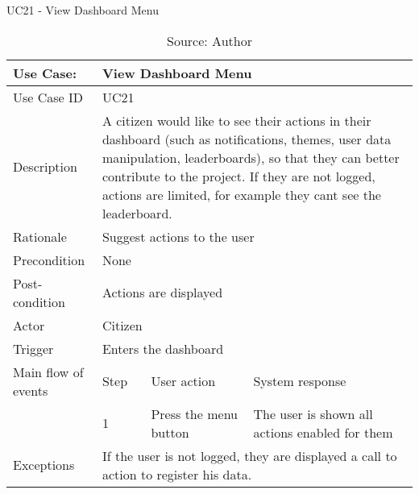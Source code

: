\begin{table}[ht]
\centering
\caption{UC21 - View Dashboard Menu}
\label{uc:21}
\begin{tabular}{|p{3cm}|p{1cm}|p{5cm}|p{5cm}|}
\hline
Use Case:       & \multicolumn{3}{p{11cm}|}{View Dashboard Menu} \\ \hline
Use Case ID     & \multicolumn{3}{p{11cm}|}{UC21} \\ \hline
Description     & \multicolumn{3}{p{11cm}|}{A citizen would like to see their actions in their dashboard (such as notifications, themes, user data manipulation, leaderboards), so that they can better contribute to the project. If they are not logged, actions are limited, for example they cant see the leaderboard.} \\ \hline
Rationale       & \multicolumn{3}{p{11cm}|}{Suggest actions to the user} \\ \hline
Precondition    & \multicolumn{3}{p{11cm}|}{None} \\ \hline
Post-condition  & \multicolumn{3}{p{11cm}|}{Actions are displayed} \\ \hline
Actor           & \multicolumn{3}{p{11cm}|}{Citizen} \\ \hline
Trigger         & \multicolumn{3}{p{11cm}|}{Enters the dashboard} \\ \hline
Main flow of events & Step  & User action & System response \\ \hline
                    & 1     & Press the menu button & The user is shown all actions enabled for them \\ \hline
Exceptions      & \multicolumn{3}{p{11cm}|}{If the user is not logged, they are displayed a call to action to register his data.} \\ \hline
\end{tabular}
\caption*{Source: Author}
\end{table}

